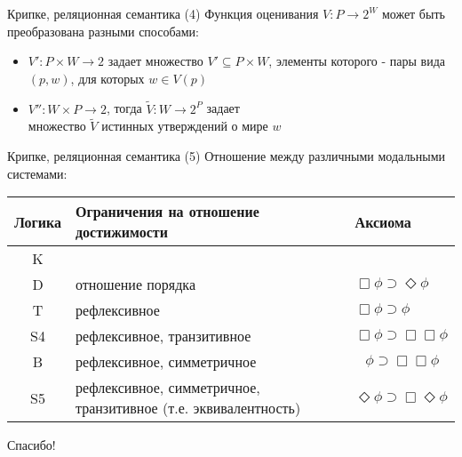 \documentclass{beamer}
\begin{document}
\begin{frame}{Крипке, реляционная семантика (4)}
Функция оценивания $V: P \to 2^W$ может быть преобразована разными способами:\\
\bigskip
\begin{itemize}
  \item $V': P \times W \to 2$ задает множество $V' \subseteq P \times W$, элементы которого - пары вида $(p, w)$, для которых $w \in V(p)$
  \item $V'': W \times P \to 2$, тогда $\tilde{V} : W \to 2^P$ задает\\ множество $\tilde{V}$ истинных утверждений о мире $w$
\end{itemize}
\end{frame}

\begin{frame}{Крипке, реляционная семантика (5)}
Отношение между различными модальными системами:\\
\bigskip
\begin{table}
  \begin{scriptsize}
    \begin{tabular}{c|p{5.9cm}|l}
    \textbf{Логика} & \textbf{Ограничения на отношение достижимости} & \textbf{Аксиома} \\ \hline
    K & ~ & ~ \\
    D & отношение порядка & $\Box \phi \supset \Diamond \phi$ \\
    T & рефлексивное & $\Box \phi \supset \phi$ \\
    S4 & рефлексивное, транзитивное & $\Box \phi \supset \Box \Box \phi$ \\
    B & рефлексивное, симметричное & $\; \; \, \phi \supset \Box \Box \phi$ \\
    S5 & рефлексивное, симметричное, транзитивное (т.е. эквивалентность) & $\Diamond \phi \supset \Box \Diamond \phi$ \\
    \end{tabular}
  \end{scriptsize}
\end{table}
\end{frame}

\begin{frame}{}
    \thispagestyle{empty}
    \begin{center}
        {\large Спасибо!}
    \end{center}
\end{frame}


\end{document}

